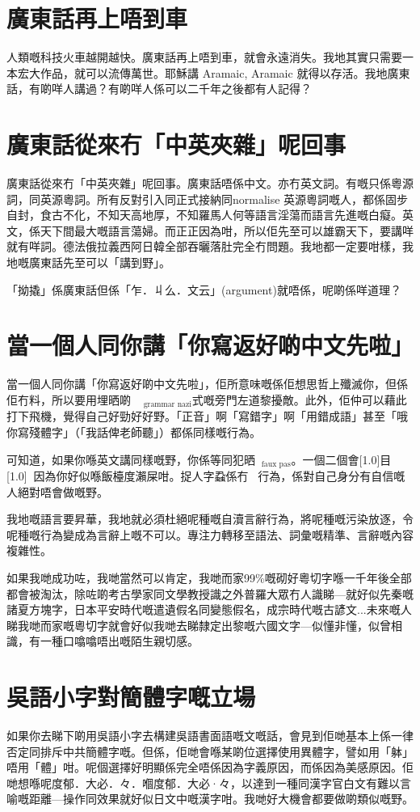 \documentclass[a5paper, 10pt, openany]{book} %
\begin{document}
\chapter{廣東話再上唔到車}
人類嘅科技火車越開越快。廣東話再上唔到車，就會永遠消失。我地其實只需要一本宏大作品，就可以流傳萬世。耶穌講 Aramaic, Aramaic 就得以存活。我地廣東話，有啲咩人講過？有啲咩人係可以二千年之後都有人記得？


\chapter{廣東話從來冇「中英夾雜」呢回事}
廣東話從來冇「中英夾雜」呢回事。廣東話唔係中文。亦冇英文詞。有嘅只係粵源詞，同英源粵詞。所有反對引入同正式接納同normalise 英源粵詞嘅人，都係固步自封，食古不化，不知天高地厚，不知羅馬人何等語言淫蕩而語言先進嘅白癡。英文，係天下間最大嘅語言蕩婦。而正正因為咁，所以佢先至可以雄霸天下，要講咩就有咩詞。德法俄拉義西阿日韓全部吞曬落肚完全冇問題。我地都一定要咁樣，我地嘅廣東話先至可以「講到野」。


「拗撬」係廣東話但係「乍．丩么．文云」(argument)就唔係，呢啲係咩道理？

\chapter{當一個人同你講「你寫返好啲中文先啦」}

當一個人同你講「你寫返好啲中文先啦」，佢所意味嘅係佢想思哲上殲滅你，但係佢冇料，所以要用埋晒啲󰲎󱂧$_{\text{grammar nazi}}$式嘅旁門左道黎擾敵。此外，佢仲可以藉此打下飛機，覺得自己好勁好好野。「正音」啊「寫錯字」啊「用錯成語」甚至「哦你寫殘體字」（「我話俾老師聽」）都係同樣嘅行為。

可知道，如果你喺英文講同樣嘅野，你係等同犯晒󰠲󰎖$_{\text{faux pas}}$。一個二個會\scalebox{0.5}[1.0]{目}\scalebox{0.5}[1.0]{}，因為你好似喺飯檯度瀨屎咁。捉人字蝨係冇󱐡󱝚行為，係對自己身分有自信嘅人絕對唔會做嘅野。

我地嘅語言要昇華，我地就必須杜絕呢種嘅自瀆言辭行為，將呢種嘅污染放逐，令呢種嘅行為變成為言辭上嘅不可以。專注力轉移至語法、詞彙嘅精準、言辭嘅內容複雜性。


如果我哋成功咗，我哋當然可以肯定，我哋而家99\%嘅砌好粵切字喺一千年後全部都會被淘汰，除咗啲考古學家同文學教授識之外普羅大眾冇人識睇—就好似先秦嘅諸夏方塊字，日本平安時代嘅遣遺假名同變態假名，成宗時代嘅古諺文...未來嘅人睇我哋而家嘅粵切字就會好似我哋去睇隸定出黎嘅六國文字—似懂非懂，似曾相識，有一種口噏噏唔出嘅陌生親切感。

\chapter{吳語小字對簡體字嘅立場}
如果你去睇下啲用吳語小字去構建吳語書面語嘅文嘅話，會見到佢哋基本上係一律否定同排斥中共簡體字嘅。但係，佢哋會喺某啲位選擇使用異體字，譬如用「躰」唔用「體」咁。呢個選擇好明顯係完全唔係因為字義原因，而係因為美感原因。佢哋想喺呢度郁．大必．々．嗰度郁．大必·々，以達到一種同漢字官白文有難以言喻嘅距離—操作同效果就好似日文中嘅漢字咁。我哋好大機會都要做啲類似嘅野。
\end{document}
